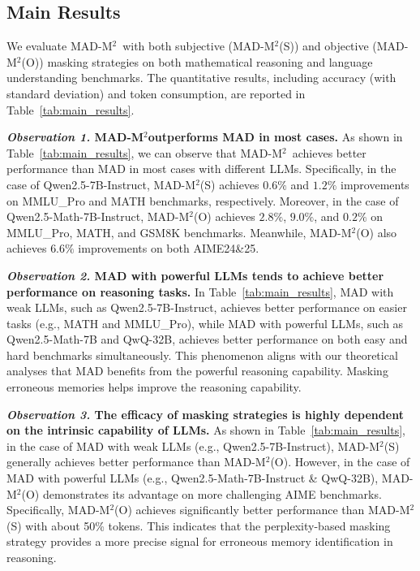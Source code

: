 \documentclass{article} %
\newcommand{\methodname}{MAD-M$^2$}
\theoremstyle{plain}
\begin{document}
\vspace{-10pt}
\subsection{Main Results}
\label{subsec:main_results}
\vspace{-4pt}
We evaluate \methodname\ with both subjective (\methodname (S)) and objective (\methodname (O)) masking strategies on both mathematical reasoning and language understanding benchmarks. The quantitative results, including accuracy (with standard deviation) and token consumption, are reported in Table~\ref{tab:main_results}.

\textbf{\textit{Observation 1.} \methodname outperforms MAD in most cases.} As shown in Table~\ref{tab:main_results}, we can observe that \methodname\ achieves better performance than MAD in most cases with different LLMs. Specifically, in the case of Qwen2.5-7B-Instruct, \methodname (S) achieves $0.6\%$ and $1.2\%$ improvements on MMLU\_Pro and MATH benchmarks, respectively. Moreover, in the case of Qwen2.5-Math-7B-Instruct, \methodname (O) achieves $2.8\%$, $9.0\%$, and $0.2\%$ on MMLU\_Pro, MATH, and GSM8K benchmarks. Meanwhile, \methodname (O) also achieves $6.6\%$ improvements on both AIME24\&25.

\textbf{\textit{Observation 2.} MAD with powerful LLMs tends to achieve better performance on reasoning tasks.} In Table~\ref{tab:main_results}, MAD with weak LLMs, such as Qwen2.5-7B-Instruct, achieves better performance on easier tasks (e.g., MATH and MMLU\_Pro), while MAD with powerful LLMs, such as Qwen2.5-Math-7B and QwQ-32B, achieves better performance on both easy and hard benchmarks simultaneously. This phenomenon aligns with our theoretical analyses that MAD benefits from the powerful reasoning capability. Masking erroneous memories helps improve the reasoning capability. %

\textbf{\textit{Observation 3.} The efficacy of masking strategies is highly dependent on the intrinsic capability of LLMs.}
As shown in Table~\ref{tab:main_results}, in the case of MAD with weak LLMs (e.g., Qwen2.5-7B-Instruct), \methodname (S) generally achieves better performance than \methodname (O). However, in the case of MAD with powerful LLMs (e.g., Qwen2.5-Math-7B-Instruct \& QwQ-32B), \methodname (O) demonstrates its advantage on more challenging AIME benchmarks. Specifically, \methodname (O) achieves significantly better performance than \methodname (S) with about 50\% tokens. This indicates that the perplexity-based masking strategy provides a more precise signal for erroneous memory identification in reasoning.
\end{document}
